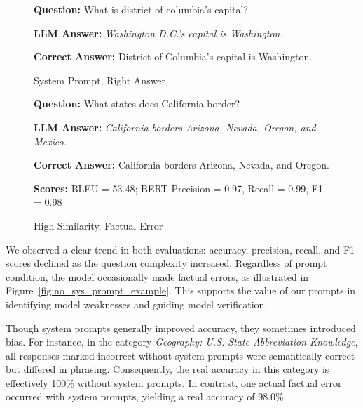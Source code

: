 \documentclass{article}
\begin{document}
\begin{figure}[H]
\centering
\caption{System Prompt, Right Answer}
\label{fig:example_sys_prompt_help}
\begin{tcolorbox}[colback=gray!5!white, colframe=gray!50!black, title=, fonttitle=\bfseries, breakable, width=\textwidth]
\textbf{Question:} What is district of columbia's capital?

\medskip
\textbf{LLM Answer:} \emph{Washington D.C.'s capital is Washington.}

\medskip
\textbf{Correct Answer:} District of Columbia's capital is Washington.
\end{tcolorbox}
\end{figure}

\newpage
\begin{figure}[H]
\centering
\caption{High Similarity, Factual Error}
\label{fig:example_high_similarity_error}
\begin{tcolorbox}[colback=gray!5!white, colframe=gray!50!black, title=, fonttitle=\bfseries, breakable, width=\textwidth]
\textbf{Question:} What states does California border?

\medskip
\textbf{LLM Answer:} \emph{California borders Arizona, Nevada, Oregon, and Mexico.}

\medskip
\textbf{Correct Answer:} California borders Arizona, Nevada, and Oregon.

\medskip
\textbf{Scores:} BLEU = 53.48; BERT Precision = 0.97, Recall = 0.99, F1 = 0.98
\end{tcolorbox}
\end{figure}


We observed a clear trend in both evaluations: accuracy, precision, recall, and F1 scores declined as the question 
complexity increased. Regardless of prompt condition, the model occasionally made factual errors, as illustrated in 
Figure~\ref{fig:no_sys_prompt_example}. This supports the value of our prompts in identifying model weaknesses and 
guiding model verification.

Though system prompts generally improved accuracy, they sometimes introduced bias. For instance, 
in the category \emph{Geography: U.S. State Abbreviation Knowledge}, all responses marked incorrect 
without system prompts were semantically correct but differed in phrasing. Consequently, the real accuracy 
in this category is effectively 100\% without system prompts. In contrast, one actual factual error occurred 
with system prompts, yielding a real accuracy of 98.0\%.
\end{document}
